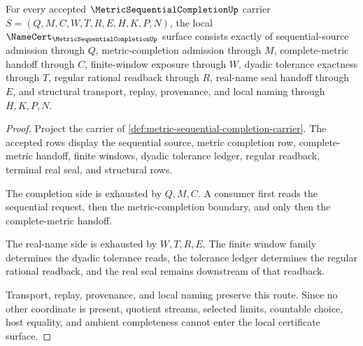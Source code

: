 \begin{theorem}
\label{thm:metric-sequential-completion-namecert-obligations}
For every accepted $\MetricSequentialCompletionUp$ carrier $S=(Q,M,C,W,T,R,E,H,K,P,N)$, the local $\NameCert_{\MetricSequentialCompletionUp}$ surface consists exactly of sequential-source admission through $Q$, metric-completion admission through $M$, complete-metric handoff through $C$, finite-window exposure through $W$, dyadic tolerance exactness through $T$, regular rational readback through $R$, real-name seal handoff through $E$, and structural transport, replay, provenance, and local naming through $H,K,P,N$.
\end{theorem}
\begin{proof}
Project the carrier of \autoref{def:metric-sequential-completion-carrier}. The accepted rows display the sequential source, metric completion row, complete-metric handoff, finite windows, dyadic tolerance ledger, regular readback, terminal real seal, and structural rows.

The completion side is exhausted by $Q,M,C$. A consumer first reads the sequential request, then the metric-completion boundary, and only then the complete-metric handoff.

The real-name side is exhausted by $W,T,R,E$. The finite window family determines the dyadic tolerance reads, the tolerance ledger determines the regular rational readback, and the real seal remains downstream of that readback.

Transport, replay, provenance, and local naming preserve this route. Since no other coordinate is present, quotient streams, selected limits, countable choice, host equality, and ambient completeness cannot enter the local certificate surface.
\end{proof}

